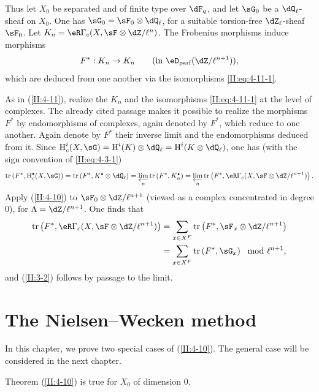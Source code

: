 Thus let $X_0$ be separated and of finite type over $\dF_q$, and let $\sG_0$
be a $\dQ_\ell$-sheaf on $X_0$. One has
$\sG_0=\sF_0\otimes\dQ_\ell$, for a suitable torsion-free
$\dZ_\ell$-sheaf $\sF_0$. Let
$K_n=\eR\Gamma_c(X,\sF\otimes\dZ/\ell^n)$. The Frobenius morphisms induce
morphisms
\[
  F^* : K_n\to K_n \qquad \text{(in $\eD_\text{parf}(\dZ/\ell^{n+1})$),}
\]
which are deduced from one another via the isomorphisms
\eqref{II:eq:4-11-1}.

As in (\ref{II:4-11}), realize the $K_n$ and the isomorphisms
\eqref{II:eq:4-11-1} at the level of complexes. The already cited passage
\cite[XV.3.3]{sga5} makes it possible to realize the morphisms $F^*$ by
endomorphisms of complexes, again denoted by $F^*$, which reduce to one
another. Again denote by $F^*$ their inverse limit and the endomorphisms
deduced from it. Since
$\h_c^i(X,\sG) = \h^i(K)\otimes\dQ_\ell = \h^i(K\otimes\dQ_\ell)$, one has
(with the sign convention of \ref{II:eq:4-3-1})
\[
  \tr\left(F^*, \h_c^\bullet(X,\sG)\right) = \tr\left(F^*,K^\bullet\otimes\dQ_\ell\right) = \varprojlim_n \tr\left(F^*,K_n^\bullet\right) = \varprojlim_n \tr\left(F^*,\eR\Gamma_c(X,\sF\otimes\dZ/\ell^{n+1})\right) \text{.}
\]
Apply (\ref{II:4-10}) to $\sF_0\otimes\dZ/\ell^{n+1}$ (viewed as a complex
concentrated in degree $0$), for $\Lambda=\dZ/\ell^{n+1}$. One finds that
\begin{align*}
  \tr\left(F^*,\eR\Gamma_c(X,\sF\otimes\dZ/\ell^{n+1})\right)
    &= \sum_{x\in X^F} \tr\left(F^*,\sF_x\otimes\dZ/\ell^{n+1}\right) \\
    &= \sum_{x\in X^F} \tr\left(F^*,\sG_x\right) \mod \ell^{n+1} \text{,}
\end{align*}
and (\ref{II:3-2}) follows by passage to the limit.











\section{The Nielsen--Wecken method}\label{II:5}

In this chapter, we prove two special cases of (\ref{II:4-10}). The general
case will be considered in the next chapter.






\begin{lemma_}\label{II:5-1}
Theorem (\ref{II:4-10}) is true for $X_0$ of dimension $0$.
\end{lemma_}

